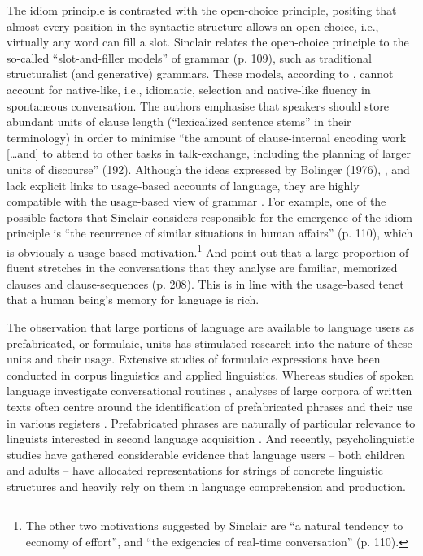 \noindent The idiom principle is contrasted with the open-choice principle, positing that almost every position in the syntactic structure allows an open choice, i.e., virtually any word can fill a slot. Sinclair relates the open-choice principle to the so-called ``slot-and-filler models'' of grammar (p. 109), such as traditional structuralist (and generative) grammars. These models, according to \citet{pawley-syder-1983}, cannot account for native-like, i.e., idiomatic, selection and native-like fluency in spontaneous conversation. The authors emphasise that speakers should store abundant units of clause length (``lexicalized sentence stems'' in their terminology) in order to minimise ``the amount of clause-internal encoding work [\dots and] to attend to other tasks in talk-exchange, including the planning of larger units of discourse'' (192). Although the ideas expressed by Bolinger (1976), \citet{pawley-syder-1983}, and \citet{sinclair-1991} lack explicit links to usage-based accounts of language, they are highly compatible with the usage-based view of grammar \citep[cf.][]{five-graces}. For example, one of the possible factors that Sinclair considers responsible for the emergence of the idiom principle is ``the recurrence of similar situations in human affairs'' (p. 110), which is obviously a usage-based motivation.\footnote{The other two motivations suggested by Sinclair are ``a natural tendency to economy of effort'', and  ``the exigencies of real-time conversation'' (p. 110).} And \citet{pawley-syder-1983} point out that a large proportion of fluent stretches in the conversations that they analyse are familiar, memorized clauses and clause-sequences (p. 208). This is in line with the usage-based tenet that a human being's memory for language is rich.

The observation that large portions of language are available to language users as prefabricated, or formulaic, units has stimulated research into the nature of these units and their usage. Extensive studies of formulaic expressions have been conducted in corpus linguistics and applied linguistics. Whereas studies of spoken language investigate conversational routines \citep{aijmer-1996,altenberg-1990,altenberg-1998}, analyses of large corpora of written texts often centre around the identification of prefabricated phrases \citep[e.g.,][]{erman-warren-2000,gries-2010,evert-2005} and their use in various registers \citep[e.g.,][]{biber-conrad-1999,gries-mukh-2010}. Prefabricated phrases are naturally of particular relevance to linguists interested in second language acquisition \citep[e.g.,][]{granger-1998,ellis-etal-2008,biber-etal-2004,schmitt2004}. And recently, psycholinguistic studies have gathered considerable evidence that language users -- both children and adults -- have allocated representations for strings of concrete linguistic structures and heavily rely on them in language comprehension and production. 

